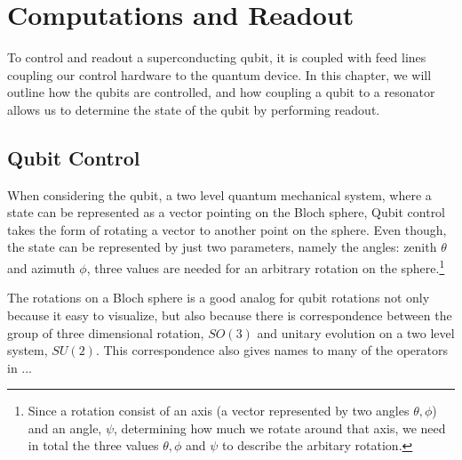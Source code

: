 \chapter{Computations and Readout}\label{chap:computations_and_readout}
To control and readout a superconducting qubit, it is coupled with feed lines coupling our control hardware to the quantum device. In this chapter, we will outline how the qubits are controlled, and how coupling a qubit to a resonator allows us to determine the state of the qubit by performing readout.


\section{Qubit Control}\label{sec:qubit_control}
When considering the qubit, a two level quantum mechanical system, where a state can be represented as a vector pointing on the Bloch sphere, Qubit control takes the form of rotating a vector to another point on the sphere. Even though, the state can be represented by just two parameters, namely the angles: zenith $\theta$ and azimuth $\phi$, three values are needed for an arbitrary rotation on the sphere.\footnote{Since a rotation consist of an axis (a vector represented by two angles $\theta, \phi$) and an angle, $\psi$, determining how much we rotate around that axis, we need in total the three values $\theta, \phi$ and $\psi$ to describe the arbitary rotation.}

The rotations on a Bloch sphere is a good analog for qubit rotations not only because it easy to visualize, but also because there is correspondence between the group of three dimensional rotation, $SO(3)$ and unitary evolution on a two level system, $SU(2)$. This correspondence also gives names to many of the operators in ... 

